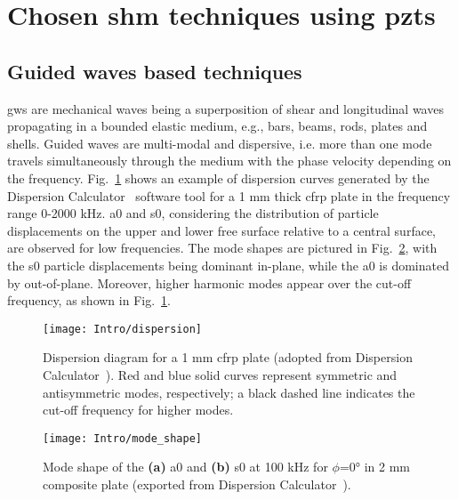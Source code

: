 \section{Chosen \acs{shm} techniques using \acsp{pzt}}
\label{sec:techniques}


\subsection{Guided waves based techniques}


\Acp{gw} are mechanical waves being a superposition of shear and longitudinal waves propagating in a bounded elastic medium, e.g., bars, beams, rods, plates and shells. 
Guided waves are multi-modal and dispersive, i.e. more than one mode travels simultaneously through the medium with the phase velocity depending on the frequency.
Fig.~\ref{fig:dispersion} shows an example of dispersion curves generated by the Dispersion Calculator~\cite{huber2021dispersion} software tool for a 1 \unit{\mm} thick \ac{cfrp} plate in the frequency range 0-2000 \unit{\kHz}.
\Ac{a0} and \ac{s0}, considering the distribution of particle displacements on the upper and lower free surface relative to a central surface, are observed for low frequencies.
The mode shapes are pictured in Fig.~\ref{fig:mode_shape}, with the \ac{s0} particle displacements being dominant in-plane, while the \ac{a0} is dominated by out-of-plane.
Moreover, higher harmonic modes appear over the cut-off frequency, as shown in Fig.~\ref{fig:dispersion}.
\begin{figure}
	\begin{center}
		\texttt{[image: Intro/dispersion]}
	\end{center}
	\caption{Dispersion diagram for a 1 \unit{\mm} \acf{cfrp} plate (adopted from Dispersion Calculator~\cite{huber2021dispersion}). Red and blue solid curves represent symmetric and antisymmetric modes, respectively; a black dashed line indicates the cut-off frequency for higher modes.}
	\label{fig:dispersion}
\end{figure}
\begin{figure}
	\begin{center}
		\texttt{[image: Intro/mode\_shape]}
	\end{center}
	\caption{Mode shape of the \textbf{(a)} \acf{a0} and \textbf{(b)} \acf{s0} at 100 \unit{\kHz} for \(\phi\)=\ang{0} in 2 \unit{\mm} composite plate (exported from Dispersion Calculator~\cite{huber2021dispersion}).}
	\label{fig:mode_shape}
\end{figure}

